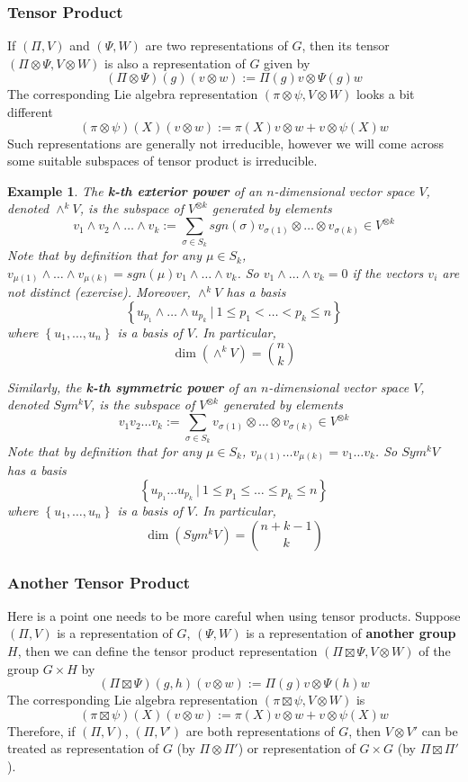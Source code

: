 \documentclass[11pt]{article}
\newtheorem{example}[theorem]{Example}
\begin{document}
\subsubsection{Tensor Product}
If $(\Pi,V)$ and $(\Psi,W)$ are two representations of $G$, then its tensor $(\Pi \otimes \Psi, V \otimes W)$ is also a representation of $G$ given by
$$(\Pi \otimes \Psi)(g)(v\otimes w) := \Pi(g)v \otimes \Psi(g)w$$
The corresponding Lie algebra representation $(\pi \otimes \psi, V \otimes W)$ looks a bit different
$$(\pi \otimes \psi)(X)(v \otimes w) := \pi(X)v \otimes w + v \otimes \psi(X)w$$
Such representations are generally not irreducible, however we will come across some suitable subspaces of tensor product is irreducible.
\begin{example}
The \textbf{k-th exterior power} of an $n$-dimensional vector space $V$, denoted $\wedge^k V$, is the subspace of $V^{\otimes k}$ generated by elements
$$v_1 \wedge v_2 \wedge \dots \wedge v_k := \sum_{\sigma \in S_k} sgn(\sigma) v_{\sigma(1)} \otimes \dots \otimes v_{\sigma(k)} \in V^{\otimes k}$$
Note that by definition that for any $\mu \in S_k$, $v_{\mu(1)} \wedge \dots \wedge v_{\mu(k)} = sgn(\mu) v_1 \wedge \dots \wedge v_k$. So $v_1 \wedge \dots \wedge v_k = 0$ if the vectors $v_i$ are not distinct (exercise). Moreover, $\wedge^k V$ has a basis $$\left\{ u_{p_1} \wedge \dots \wedge u_{p_k}\ \Big|\ 1\leq p_1 < \dots < p_k \leq n \right\}$$
where $\left\{u_1, \dots, u_n\right\}$ is a basis of $V$. In particular,
$$\dim(\wedge^k V) = {n \choose k}$$

Similarly, the \textbf{k-th symmetric power} of an $n$-dimensional vector space $V$, denoted $Sym^k V$, is the subspace of $V^{\otimes k}$ generated by elements
$$v_1 v_2 \dots v_k := \sum_{\sigma \in S_k} v_{\sigma(1)} \otimes \dots \otimes v_{\sigma(k)} \in V^{\otimes k}$$
Note that by definition that for any $\mu \in S_k$, $v_{\mu(1)} \dots  v_{\mu(k)} = v_1  \dots  v_k$. So $Sym^k V$ has a basis $$\left\{ u_{p_1} \dots u_{p_k}\ \Big|\ 1\leq p_1 \leq \dots \leq p_k \leq n \right\}$$
where $\left\{u_1, \dots, u_n\right\}$ is a basis of $V$. In particular,
$$\dim(Sym^k V) = {n+k-1 \choose k}$$
\end{example}

\subsubsection{Another Tensor Product}
Here is a point one needs to be more careful when using tensor products. Suppose $(\Pi,V)$ is a representation of $G$, $(\Psi, W)$ is a representation of \textbf{another group} $H$, then we can define the tensor product representation $(\Pi \boxtimes \Psi, V \otimes W)$ of the group $G \times H$ by
$$(\Pi \boxtimes \Psi)(g,h)(v\otimes w) := \Pi(g)v \otimes \Psi(h)w$$
The corresponding Lie algebra representation $(\pi \boxtimes \psi, V \otimes W)$ is
$$(\pi \boxtimes \psi)(X)(v \otimes w) := \pi(X)v \otimes w + v \otimes \psi(X)w$$
Therefore, if $(\Pi,V)$, $(\Pi,V')$ are both representations of $G$, then $V \otimes V'$ can be treated as representation of $G$ (by $\Pi \otimes \Pi'$) or representation of $G \times G$ (by $\Pi \boxtimes \Pi'$). \\
\end{document}
